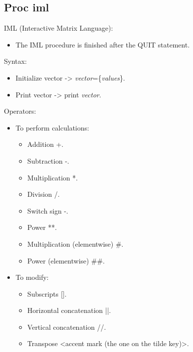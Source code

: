 \documentclass[11pt, oneside]{article}
\begin{document}
\subsection{Proc iml}

IML (Interactive Matrix Language):
\begin{itemize}
\item The IML procedure is finished after the QUIT statement.
\end{itemize}

Syntax:
\begin{itemize}
\item Initialize vector -> \textit{vector}=\{\textit{values}\}.
\item Print vector -> print \textit{vector}.
\end{itemize}

Operators:
\begin{itemize}
\item To perform calculations:
	\begin{itemize}
	\item Addition +.
	\item Subtraction -.
	\item Multiplication *.
	\item Division /.
	\item Switch sign -.
	\item Power **.
	\item Multiplication (elementwise) \#.
	\item Power (elementwise) \#\#.
	\end{itemize}
\item To modify:
	\begin{itemize}
	\item Subscripts [].
	\item Horizontal concatenation ||.
	\item Vertical concatenation //.
	\item Transpose <accent mark (the one on the tilde key)>.
	\end{itemize}
\end{itemize}
\end{document}
